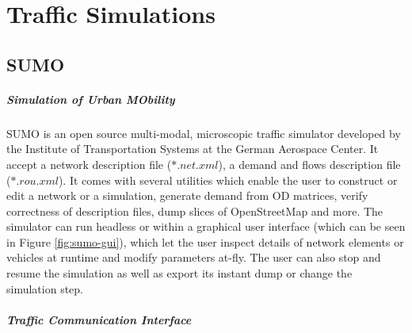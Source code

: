 \chapter{Traffic Simulations}
\label{chapter:traffic-simulations}

\section{SUMO}

\paragraph{\textbf{S}imulation of \textbf{U}rban \textbf{MO}bility}

SUMO \cite{krajzewicz2002sumo} is an open source multi-modal, microscopic traffic simulator developed by the Institute of Transportation Systems at the German Aerospace Center. It accept a network description file ($*.net.xml$), a demand and flows description file ($*.rou.xml$). It comes with several utilities which enable the user to construct or edit a network or a simulation, generate demand from OD matrices, verify correctness of description files, dump slices of OpenStreetMap and more. The simulator can run headless or within a graphical user interface (which can be seen in Figure \ref{fig:sumo-gui}), which let the user inspect details of network elements or vehicles at runtime and modify parameters at-fly. The user can also stop and resume the simulation as well as export its instant dump or change the simulation step.


\paragraph{\textbf{T}raffic \textbf{C}ommunication \textbf{I}nterface}

